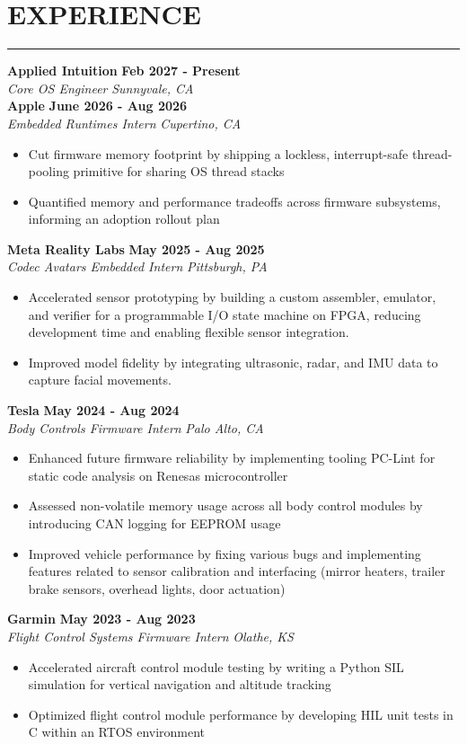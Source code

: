 \documentclass[10pt]{article}
\newcommand{\sectionHeader}[1]{%
    \vspace{-1.25\baselineskip}
    \section*{\large \MakeUppercase{#1}}
    \vspace{-1.5\baselineskip}
    \color{teal}
    \rule{\textwidth}{1.5pt} %
    \color{black}
    \vspace{-1.25\baselineskip}
    \pdfbookmark[1]{#1}{#1}
}
\newcommand{\role}[3]{
    \textit{#1} \hfill \textit{#2} \\[0pt]
    #3
}
\newcommand{\sectionItem}[5]{ %
    \textbf{#1} \hfill \textbf{#2} \\[0pt]
    \role{#3}{#4}{#5}    %
}
\begin{document}
\sectionHeader{Experience}
\begin{flushleft}
    \sectionItem{Applied Intuition}{Feb 2027 - Present}{Core OS Engineer}{Sunnyvale, CA}{}
    \sectionItem{Apple}{June 2026 - Aug 2026}{Embedded Runtimes Intern}{Cupertino, CA}{
        \begin{itemize}
        \item Cut firmware memory footprint by shipping a lockless, interrupt-safe thread-pooling primitive for sharing OS thread stacks
        \item Quantified memory and performance tradeoffs across firmware subsystems, informing an adoption rollout plan
        \end{itemize}
    }

    \sectionItem{Meta Reality Labs}{May 2025 - Aug 2025}{Codec Avatars Embedded Intern}{Pittsburgh, PA}{
        \begin{itemize}
        \item Accelerated sensor prototyping by building a custom assembler, emulator, and verifier for a programmable I/O state machine on FPGA, reducing development time and enabling flexible sensor integration.
        \item Improved model fidelity by integrating ultrasonic, radar, and IMU data to capture facial movements.
        \end{itemize}
    }
    
    \sectionItem{Tesla}{May 2024 - Aug 2024}{Body Controls Firmware Intern}{Palo Alto, CA}{
        \begin{itemize}
            \item Enhanced future firmware reliability by implementing tooling PC-Lint for static code analysis on Renesas microcontroller
            \item Assessed non-volatile memory usage across all body control modules by introducing CAN logging for EEPROM usage
            \item Improved vehicle performance by fixing various bugs and implementing features related to sensor calibration and interfacing (mirror heaters, trailer brake sensors, overhead lights, door actuation)     
        \end{itemize}
    }
    
    \sectionItem{Garmin}{May 2023 - Aug 2023}{Flight Control Systems Firmware Intern}{Olathe, KS}{
        \begin{itemize}
            \item Accelerated aircraft control module testing by writing a Python SIL simulation for vertical navigation and altitude tracking
            \item Optimized flight control module performance by developing HIL unit tests in C within an RTOS environment
        \end{itemize}
    }


\end{flushleft}
\end{document}
